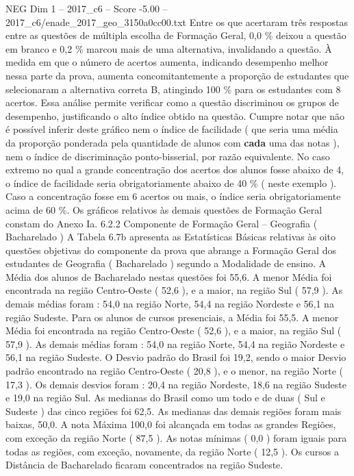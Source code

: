 \begin{textsample}{NEG Dim 1 – 2017\_c6 – Score -5.00 – 2017\_c6/enade\_2017\_geo\_3150a0cc00.txt}
Entre os que acertaram três respostas entre as questões de múltipla escolha de Formação Geral, 0,0 \% deixou a questão em branco e 0,2 \% marcou mais de uma alternativa, invalidando a questão.
À medida em que o número de acertos aumenta, indicando desempenho melhor nessa parte da prova, aumenta concomitantemente a proporção de estudantes que selecionaram a alternativa correta B, atingindo 100 \% para os estudantes com 8 acertos.
Essa análise permite verificar como a questão discriminou os grupos de desempenho, justificando o alto índice obtido na questão.
Cumpre notar que não é possível inferir deste gráfico nem o índice de facilidade ( que seria uma média da proporção ponderada pela quantidade de alunos com \textbf{cada} uma das notas ), nem o índice de discriminação ponto-bisserial, por razão equivalente.
No caso extremo no qual a grande concentração dos acertos dos alunos fosse abaixo de 4, o índice de facilidade seria obrigatoriamente abaixo de 40 \% ( neste exemplo ).
Caso a concentração fosse em 6 acertos ou mais, o índice seria obrigatoriamente acima de 60 \%.
Os gráficos relativos às demais questões de Formação Geral constam do Anexo Ia. 6.2.2 Componente de Formação Geral – Geografia ( Bacharelado ) A Tabela 6.7b apresenta as Estatísticas Básicas relativas às oito questões objetivas do componente da prova que abrange a Formação Geral dos estudantes de Geografia ( Bacharelado ) segundo a Modalidade de ensino.
A Média dos alunos de Bacharelado nestas questões foi 55,6.
A menor Média foi encontrada na região Centro-Oeste ( 52,6 ), e a maior, na região Sul ( 57,9 ).
As demais médias foram : 54,0 na região Norte, 54,4 na região Nordeste e 56,1 na região Sudeste.
Para os alunos de cursos presenciais, a Média foi 55,5.
A menor Média foi encontrada na região Centro-Oeste ( 52,6 ), e a maior, na região Sul ( 57,9 ).
As demais médias foram : 54,0 na região Norte, 54,4 na região Nordeste e 56,1 na região Sudeste.
O Desvio padrão do Brasil foi 19,2, sendo o maior Desvio padrão encontrado na região Centro-Oeste ( 20,8 ), e o menor, na região Norte ( 17,3 ).
Os demais desvios foram : 20,4 na região Nordeste, 18,6 na região Sudeste e 19,0 na região Sul.
As medianas do Brasil como um todo e de duas ( Sul e Sudeste ) das cinco regiões foi 62,5.
As medianas das demais regiões foram mais baixas, 50,0.
A nota Máxima 100,0 foi alcançada em todas as grandes Regiões, com exceção da região Norte ( 87,5 ).
As notas mínimas ( 0,0 ) foram iguais para todas as regiões, com exceção, novamente, da região Norte ( 12,5 ).
Os cursos a Distância de Bacharelado ficaram concentrados na região Sudeste.

\end{textsample}
